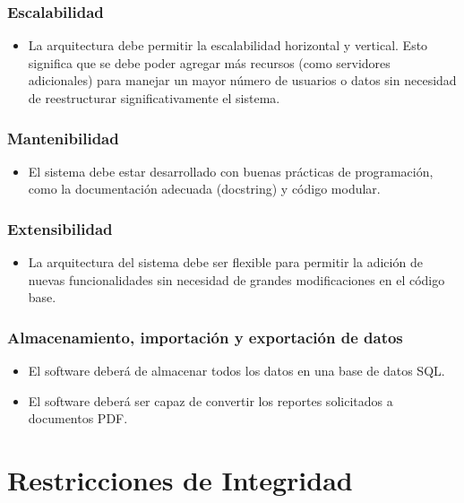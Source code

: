 \documentclass{report}
\begin{document}
    \subsubsection*{Escalabilidad}
    \begin{itemize}
        \item La arquitectura debe permitir la escalabilidad horizontal y vertical. Esto significa que se debe poder 
        agregar más recursos (como servidores adicionales) para manejar un mayor número de usuarios o datos sin 
        necesidad de reestructurar significativamente el sistema.
    \end{itemize}

    \subsubsection*{Mantenibilidad}
    \begin{itemize}
        \item El sistema debe estar desarrollado con buenas prácticas de programación, como la documentación adecuada 
        (docstring) y código modular.
    \end{itemize}

    \subsubsection*{Extensibilidad}
    \begin{itemize}
        \item La arquitectura del sistema debe ser flexible para permitir la adición de nuevas funcionalidades sin 
        necesidad de grandes modificaciones en el código base.
    \end{itemize}

    \subsubsection*{Almacenamiento, importación y exportación de datos}
    \begin{itemize}
        \item El software deberá de almacenar todos los datos en una base de datos SQL.
        \item El software deberá ser capaz de convertir los reportes solicitados a documentos PDF.
    \end{itemize}

    \section*{Restricciones de Integridad}
\end{document}
